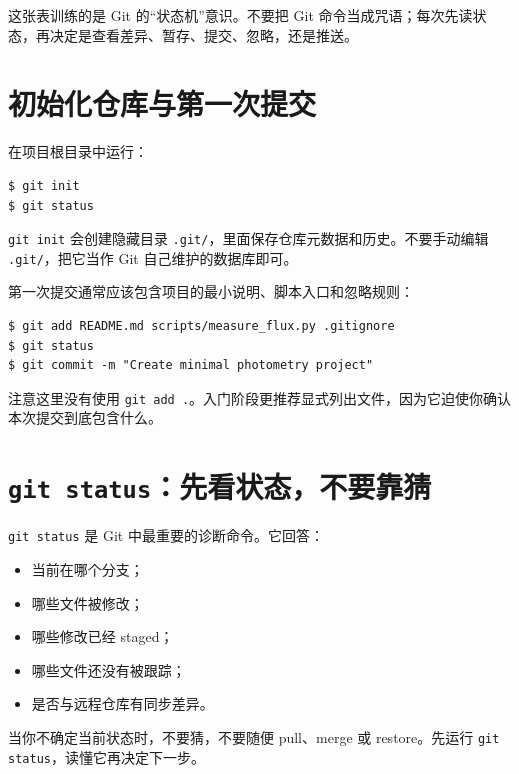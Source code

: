 这张表训练的是 Git 的“状态机”意识。不要把 Git 命令当成咒语；每次先读状态，再决定是查看差异、暂存、提交、忽略，还是推送。

\section{初始化仓库与第一次提交}

在项目根目录中运行：

\begin{examplebox}[初始化仓库]
\begin{lstlisting}[style=terminal]
$ git init
$ git status
\end{lstlisting}
\end{examplebox}

\texttt{git init} 会创建隐藏目录 \texttt{.git/}，里面保存仓库元数据和历史。不要手动编辑 \texttt{.git/}，把它当作 Git 自己维护的数据库即可。

第一次提交通常应该包含项目的最小说明、脚本入口和忽略规则：

\begin{examplebox}[第一次提交]
\begin{lstlisting}[style=terminal]
$ git add README.md scripts/measure_flux.py .gitignore
$ git status
$ git commit -m "Create minimal photometry project"
\end{lstlisting}
\end{examplebox}

注意这里没有使用 \texttt{git add .}。入门阶段更推荐显式列出文件，因为它迫使你确认本次提交到底包含什么。

\section{\texttt{git status}：先看状态，不要靠猜}

\texttt{git status} 是 Git 中最重要的诊断命令。它回答：

\begin{itemize}
    \item 当前在哪个分支；
    \item 哪些文件被修改；
    \item 哪些修改已经 staged；
    \item 哪些文件还没有被跟踪；
    \item 是否与远程仓库有同步差异。
\end{itemize}

\begin{protip}
当你不确定当前状态时，不要猜，不要随便 pull、merge 或 restore。先运行 \texttt{git status}，读懂它再决定下一步。
\end{protip}


